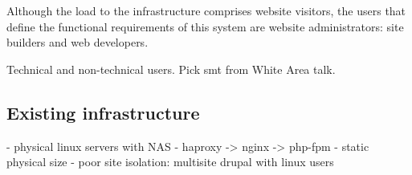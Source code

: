 Although the load to the infrastructure comprises website visitors, the users that define the functional requirements of this system are website administrators: site builders and web developers.

Technical and non-technical users.
Pick smt from White Area talk.

\subsection{Existing infrastructure}
\label{old-infra}

- physical linux servers with NAS
- haproxy -> nginx -> php-fpm
- static physical size
- poor site isolation: multisite drupal with linux users